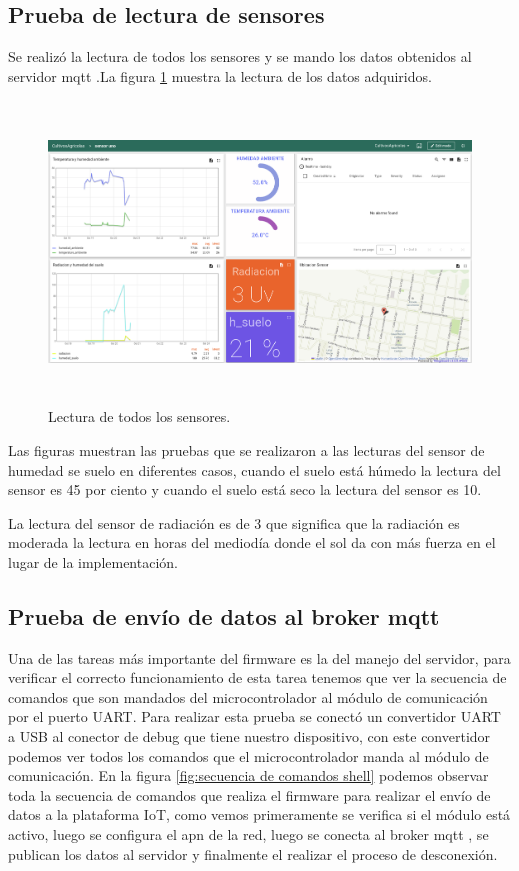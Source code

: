 \subsection{Prueba de lectura de sensores}
Se realizó la lectura de todos los sensores y se mando los datos obtenidos al servidor mqtt .La figura \ref{fig:lectura de todos los sensores} muestra la lectura de los datos adquiridos.

\begin{figure}[h!]
  \centering
    \includegraphics[width=\linewidth, height=8cm]{./Figures/lecutra_sensores_prueba.png}
  \caption{Lectura de todos los sensores.}
    \label{fig:lectura de todos los sensores}
\end{figure}

Las figuras muestran las pruebas que se realizaron a las lecturas del sensor de humedad se suelo en diferentes casos, cuando el suelo está húmedo la lectura del sensor es  45 por ciento y cuando el suelo está seco la lectura del sensor es 10.

La lectura del sensor de radiación es de 3 que significa que la radiación es moderada la lectura en horas del mediodía donde el sol da con más fuerza en el lugar de la implementación.


\subsection{Prueba de envío de datos al broker mqtt}
Una de las tareas más importante del firmware es la del manejo del servidor, para verificar el correcto funcionamiento de esta tarea tenemos que ver la secuencia de comandos que son mandados del microcontrolador al módulo de comunicación por el puerto UART.
Para realizar esta prueba se conectó un convertidor UART a USB al conector de debug que tiene nuestro dispositivo, con este convertidor podemos ver todos los comandos que el microcontrolador manda al módulo de comunicación.
En la figura \ref{fig:secuencia de comandos shell} podemos observar toda la secuencia de comandos que realiza el firmware para realizar el envío de datos a la plataforma IoT, como vemos  primeramente se verifica si el módulo está activo, luego se configura el apn de la red, luego se conecta al broker mqtt , se publican  los datos al servidor y finalmente el realizar el proceso de desconexión.

